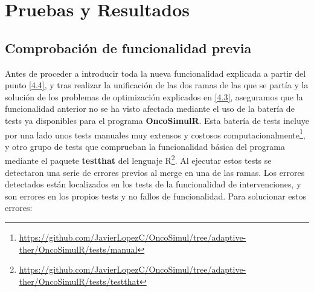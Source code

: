 \chapter{Pruebas y Resultados\label{sec:resultados}}\label{5}

\section{Comprobación de funcionalidad previa}\label{5.1}

Antes de proceder a introducir toda la nueva funcionalidad explicada a partir del punto \ref{4.4}, y tras realizar la unificación de las dos ramas de las que se partía y la solución de los problemas de optimización explicados en \ref{4.3}, aseguramos que la funcionalidad anterior no se ha visto afectada mediante el uso de la batería de tests ya disponibles para el programa \textbf{OncoSimulR}\cite{OncoSimulR}. Esta batería de tests incluye por una lado unos tests manuales muy extensos y costosos computacionalmente\footnote{\url{https://github.com/JavierLopezC/OncoSimul/tree/adaptive-ther/OncoSimulR/tests/manual}}, y otro grupo de tests que comprueban la funcionalidad básica del programa mediante el paquete \textbf{testthat}\cite{Testthat} del lenguaje R\footnote{\url{https://github.com/JavierLopezC/OncoSimul/tree/adaptive-ther/OncoSimulR/tests/testthat}}. Al ejecutar estos tests se detectaron una serie de errores previos al merge en una de las ramas. Los errores detectados están localizados en los tests de la funcionalidad de intervenciones, y son errores en los propios tests y no fallos de funcionalidad. Para solucionar estos errores:

